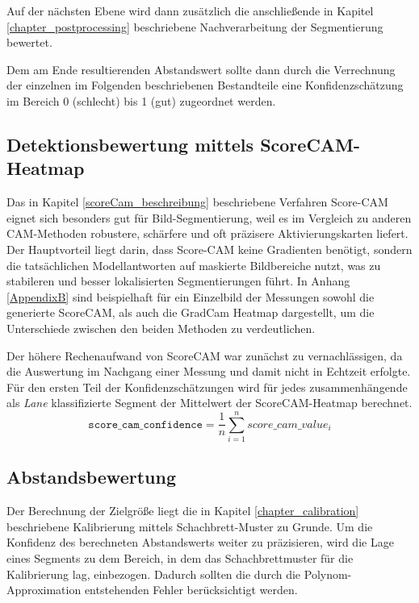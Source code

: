     Auf der nächsten Ebene wird dann zusätzlich die anschlie{\ss}ende in Kapitel \ref{chapter_postprocessing} beschriebene Nachverarbeitung der Segmentierung bewertet.
    
    Dem am Ende resultierenden Abstandswert sollte dann durch die Verrechnung der einzelnen im Folgenden beschriebenen Bestandteile eine Konfidenzschätzung im Bereich 0 (schlecht) bis 1 (gut) zugeordnet werden.
    
    \subsection{Detektionsbewertung mittels ScoreCAM-Heatmap}
        Das in Kapitel \ref{scoreCam_beschreibung} beschriebene Verfahren Score-CAM eignet sich besonders gut für Bild-Segmentierung, weil es im Vergleich zu anderen CAM-Methoden robustere, schärfere und oft präzisere Aktivierungskarten liefert. Der Hauptvorteil liegt darin, dass Score-CAM keine Gradienten benötigt, sondern die tatsächlichen Modellantworten auf maskierte Bildbereiche nutzt, was zu stabileren und besser lokalisierten Segmentierungen führt.
        In Anhang \ref{AppendixB} sind beispielhaft für ein Einzelbild der Messungen sowohl die generierte ScoreCAM, als auch die GradCam Heatmap dargestellt, um die Unterschiede zwischen den beiden Methoden zu verdeutlichen.

        Der höhere Rechenaufwand von ScoreCAM war zunächst zu vernachlässigen, da die Auswertung im Nachgang einer Messung und damit nicht in Echtzeit erfolgte.
        Für den ersten Teil der Konfidenzschätzungen wird für jedes zusammenhängende als \textit{Lane} klassifizierte Segment der Mittelwert der ScoreCAM-Heatmap berechnet.
        \[
        \texttt{score\_cam\_confidence} = \frac{1}{n} \sum_{i=1}^{n} score\_cam\_value_i
        \]
    
    \subsection{Abstandsbewertung}
        Der Berechnung der Zielgrö{\ss}e liegt die in Kapitel \ref{chapter_calibration} beschriebene Kalibrierung mittels Schachbrett-Muster zu Grunde. 
        Um die Konfidenz des berechneten Abstandswerts weiter zu präzisieren, wird die Lage eines Segments zu dem Bereich, in dem das Schachbrettmuster für die Kalibrierung lag, einbezogen. 
        Dadurch sollten die durch die Polynom-Approximation entstehenden Fehler berücksichtigt werden.
        
